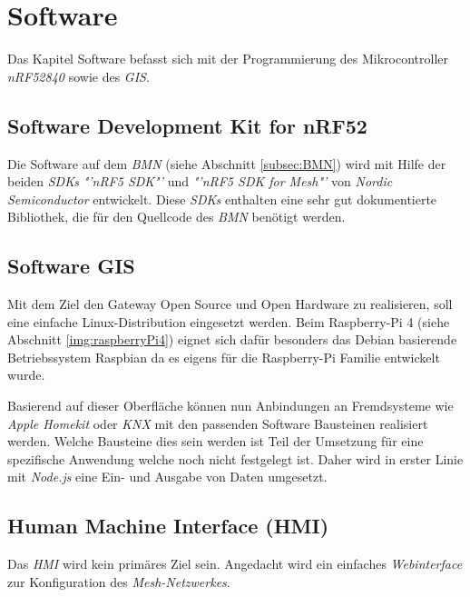 \clearpage
\section{Software}\label{sec:Software}
Das Kapitel Software befasst sich mit der Programmierung des Mikrocontroller \textit{nRF52840} sowie des \textit{GIS}.

\subsection{Software Development Kit for nRF52}\label{subsec:SDK}
Die Software auf dem \textit{BMN} (siehe Abschnitt \ref{subsec:BMN})  wird mit Hilfe der beiden \textit{SDKs} \textit{"'nRF5 SDK"'}\cite{nordic_semiconductor_nrf5_2019} und \textit{"'nRF5 SDK for Mesh"'}\cite{nordic_semiconductor_nrf5_2019-1} von \textit{Nordic Semiconductor} entwickelt. Diese \textit{SDKs} enthalten eine sehr gut dokumentierte Bibliothek, die für den Quellcode des \textit{BMN} benötigt werden.


\subsection{Software GIS}\label{subsec:SoftwareGIS}
Mit dem Ziel den Gateway Open Source und Open Hardware zu realisieren, soll eine einfache Linux-Distribution eingesetzt werden. Beim Raspberry-Pi 4 (siehe Abschnitt \ref{img:raspberryPi4}) eignet sich dafür besonders das Debian basierende Betriebssystem Raspbian da es eigens für die Raspberry-Pi Familie entwickelt wurde.

Basierend auf dieser Oberfläche können nun Anbindungen an Fremdsysteme wie \textit{Apple Homekit} oder \textit{KNX} mit den passenden Software Bausteinen realisiert werden. Welche Bausteine dies sein werden ist Teil der Umsetzung für eine spezifische Anwendung welche noch nicht festgelegt ist. Daher wird in erster Linie mit \textit{Node.js} eine Ein- und Ausgabe von Daten umgesetzt. 

\subsection{Human Machine Interface (HMI)}\label{subsec:HMI_SW}
Das \textit{HMI} wird kein primäres Ziel sein. Angedacht wird ein einfaches \textit{Webinterface} zur Konfiguration des \textit{Mesh-Netzwerkes}.

